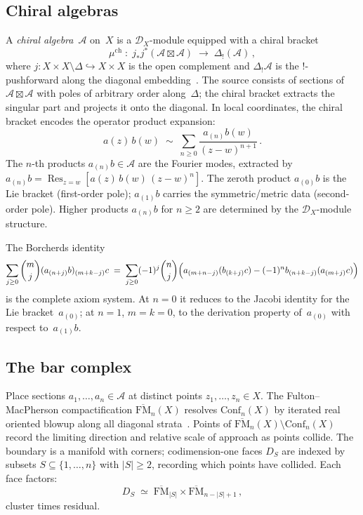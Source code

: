 \documentclass[11pt,reqno]{amsart}
\theoremstyle{definition}
\theoremstyle{remark}
\newcommand{\cA}{\mathcal{A}}
\newcommand{\cD}{\mathcal{D}}
\newcommand{\FM}{\overline{\mathrm{FM}}}
\newcommand{\Conf}{\mathrm{Conf}}
\newcommand{\Res}{\operatorname{Res}}
\numberwithin{equation}{section}
\begin{document}
\subsection{Chiral algebras}
\label{ssec:chiral}

A \emph{chiral algebra}~$\cA$ on~$X$ is a
$\cD_X$-module equipped with a chiral bracket
\[
\mu^{\mathrm{ch}}
\;\colon\;
j_* j^*(\cA \boxtimes \cA)
\;\longrightarrow\;
\Delta_!(\cA)\,,
\]
where $j \colon X \times X \setminus \Delta
\hookrightarrow X \times X$ is the open complement and
$\Delta_! \cA$ is the $!$-pushforward along the diagonal
embedding~\cite{BD04}. The source consists of sections of
$\cA \boxtimes \cA$ with poles of arbitrary order
along~$\Delta$; the chiral bracket extracts the singular
part and projects it onto the diagonal. In local coordinates,
the chiral bracket encodes the operator product expansion:
\[
a(z)\,b(w)
\;\sim\;
\sum_{n \ge 0}
\frac{a_{(n)}b(w)}{(z - w)^{n+1}}\,.
\]
The $n$-th products $a_{(n)}b \in \cA$ are the Fourier
modes, extracted by
$a_{(n)}b
= \Res_{z=w}[a(z)\,b(w)\,(z{-}w)^n]$.
The zeroth product $a_{(0)}b$ is the Lie bracket
(first-order pole); $a_{(1)}b$ carries the
symmetric/metric data (second-order pole). Higher products
$a_{(n)}b$ for $n \ge 2$ are determined by the
$\cD_X$-module structure.

The Borcherds identity
\begin{equation}\label{eq:borcherds}
\sum_{j \ge 0} \binom{m}{j}
(a_{(n+j)}b)_{(m+k-j)}c
\;=\;
\sum_{j \ge 0} (-1)^j \binom{n}{j}
\Bigl(
a_{(m+n-j)}(b_{(k+j)}c)
- (-1)^n b_{(n+k-j)}(a_{(m+j)}c)
\Bigr)
\end{equation}
is the complete axiom system. At $n = 0$ it reduces to the
Jacobi identity for the Lie bracket~$a_{(0)}$; at $n = 1$,
$m = k = 0$, to the derivation property of~$a_{(0)}$ with
respect to~$a_{(1)}b$.


\subsection{The bar complex}
\label{ssec:bar-complex}

Place sections $a_1, \ldots, a_n \in \cA$ at distinct points
$z_1, \ldots, z_n \in X$. The Fulton--MacPherson
compactification $\FM_n(X)$ resolves $\Conf_n(X)$ by
iterated real oriented blowup along all diagonal
strata~\cite{FultonMacPherson94}. Points of
$\FM_n(X) \setminus \Conf_n(X)$ record the limiting direction
and relative scale of approach as points collide. The boundary
is a manifold with corners; codimension-one faces $D_S$
are indexed by subsets $S \subseteq \{1,\ldots,n\}$ with
$|S| \ge 2$, recording which points have collided. Each face
factors:
\begin{equation}\label{eq:fm-boundary}
D_S
\;\simeq\;
\FM_{|S|} \times \FM_{n - |S| + 1}\,,
\end{equation}
cluster times residual.
\end{document}
